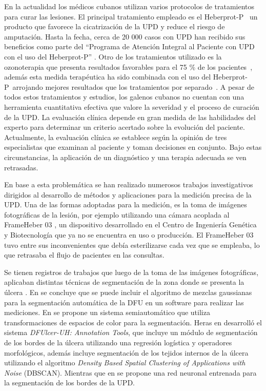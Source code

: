 En la actualidad los médicos cubanos utilizan varios protocolos de tratamientos para curar las lesiones. El principal tratamiento empleado es el Heberprot-P~\textregistered \cite{berlanga2013heberprot} un producto que favorece la cicatrización de la UPD y reduce el riesgo de amputación. Hasta la fecha, cerca de 20 000 casos con UPD han recibido sus beneficios como parte del ``Programa de Atención Integral al Paciente con UPD con el uso del Heberprot-P'' \cite{gonzalez2015resultados}. Otro de los tratamientos utilizado es la ozonoterapia que presenta resultados favorables para el 75 \% de los pacientes~\cite{alvarez2014beneficios}, además esta medida terapéutica ha sido combinada con el uso del Heberprot-P~\textregistered arrojando mejores resultados que los tratamientos por separado~\cite{martinez2019evolucion}. A pesar de todos estos tratamientos y estudios, los galenos cubanos no cuentan con una herramienta cuantitativa efectiva que valore la severidad y el proceso de curación de la UPD. La evaluación clínica depende en gran medida de las habilidades del experto para determinar un criterio acertado sobre la evolución del paciente. Actualmente, la evaluación clínica se establece según la opinión de tres especialistas que examinan al paciente y toman decisiones en conjunto. Bajo estas circunstancias, la aplicación de un diagnóstico y una terapia adecuada se ven retrasadas.

En base a esta problemática se han realizado numerosos trabajos investigativos dirigidos al desarrollo de métodos y aplicaciones para la medición precisa de la UPD. Una de las formas adoptadas para la medición, es la toma de imágenes fotográficas de la lesión, por ejemplo utilizando una cámara acoplada al FrameHeber 03 \cite{cabal2019quantitative}, un dispositivo desarrollado en el Centro de Ingeniería Genética y Biotecnología que ya no se encuentra en uso o producción. El FrameHeber 03 tuvo entre sus inconvenientes que debía esterilizarse cada vez que se empleaba, lo que retrasaba el flujo de pacientes en las consultas. 

Se tienen registros de trabajos que luego de la toma de las imágenes fotográficas, aplicaban distintas técnicas de segmentación de la zona donde se presenta la úlcera \cite{garcia2019mejoramiento, pena2016segmentacion, heras2022diabetic, ching2022segm3d}. En \cite{garcia2019mejoramiento} se concluye que se puede incluir el algoritmo de mezclas gaussianas para la segmentación automática de la DFU en un software para realizar las mediciones. En  \cite{pena2016segmentacion} se propone un sistema semiautomático que utiliza transformaciones de espacios de color para la segmentación. Heras en \cite{heras2022diabetic} desarrolló el sistema \emph{DFUlcer-UH: Annotation Tools}, que incluye un módulo de segmentación de los bordes de la úlcera utilizando una regresión logística y operadores morfológicos, además incluye segmentación de los tejidos internos de la úlcera utilizando el algoritmo \textit{Density Based Spatial Clustering of Applications with Noise} (DBSCAN). Mientras que en \cite{ching2022segm3d} se propone una red neuronal entrenada para la segmentación de los bordes de la UPD.

